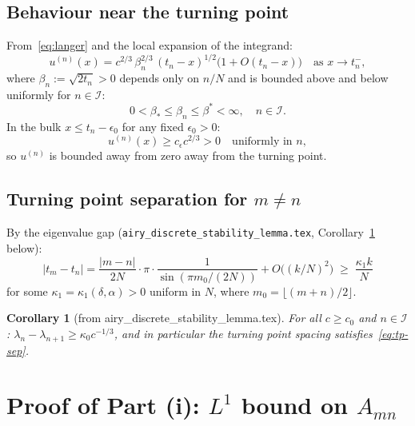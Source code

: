 \documentclass[12pt,a4paper]{amsart}
\newtheorem{corollary}[theorem]{Corollary}
\theoremstyle{definition}
\begin{document}
\subsection{Behaviour near the turning point}

From~\eqref{eq:langer} and the local expansion of the integrand:
\begin{equation}\label{eq:u-near-tp}
  u^{(n)}(x) = c^{2/3}\,\beta_n^{2/3}\,(t_n - x)^{1/2}\bigl(1 + O(t_n - x)\bigr)
  \quad \text{as } x \to t_n^-,
\end{equation}
where $\beta_n := \sqrt{2 t_n} > 0$ depends only on $n/N$ and is
bounded above and below uniformly for $n \in \mathcal{I}$:
\begin{equation}\label{eq:beta-bounds}
  0 < \beta_* \leq \beta_n \leq \beta^* < \infty, \quad n \in \mathcal{I}.
\end{equation}
In the bulk $x \leq t_n - \epsilon_0$ for any fixed $\epsilon_0 > 0$:
\begin{equation}\label{eq:u-bulk}
  u^{(n)}(x) \geq c_\epsilon c^{2/3} > 0 \quad\text{uniformly in }n,
\end{equation}
so $u^{(n)}$ is bounded away from zero away from the turning point.

\subsection{Turning point separation for $m \neq n$}

By the eigenvalue gap (\texttt{airy\_discrete\_stability\_lemma.tex},
Corollary~\ref{cor:gap} below):
\begin{equation}\label{eq:tp-sep}
  |t_m - t_n| = \frac{|m-n|}{2N}\cdot\pi \cdot \frac{1}{\sin(\pi m_0/(2N))}
  + O\bigl((k/N)^2\bigr)
  \;\geq\; \frac{\kappa_1 k}{N}
\end{equation}
for some $\kappa_1 = \kappa_1(\delta, \alpha) > 0$ uniform in $N$,
where $m_0 = \lfloor(m+n)/2\rfloor$.

\begin{corollary}[from airy\_discrete\_stability\_lemma.tex]
\label{cor:gap}
For all $c \geq c_0$ and $n \in \mathcal{I}$:
$\lambda_n - \lambda_{n+1} \geq \kappa_0 c^{-1/3}$,
and in particular the turning point spacing satisfies~\eqref{eq:tp-sep}.
\end{corollary}

\section{Proof of Part (i): $L^1$ bound on $A_{mn}$}
\label{sec:L1}
\end{document}
